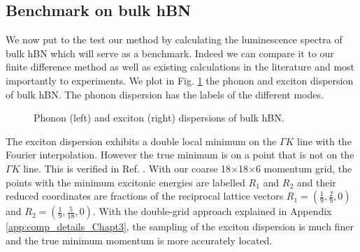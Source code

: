 \subsection{Benchmark on bulk hBN} \label{sec:bulk_hBN}
We now put to the test our method by calculating the luminescence spectra of bulk hBN which will serve as a benchmark. Indeed we can compare it to our finite difference method as well as existing calculations in the literature and most importantly to experiments. We plot in Fig. \ref{fig:ph_exc_disp_hBN} the phonon and exciton dispersion of bulk \acrlong{hBN}. The phonon dispersion has the labels of the different modes.
\begin{figure}[h!t]%
	\vspace{0.2cm}
	\setcapindent{2em}
	\centering
     \qquad
    \caption{Phonon (left) and exciton (right) dispersions of bulk \acrshort{hBN}.}
    \label{fig:ph_exc_disp_hBN} 
\end{figure}
The exciton dispersion exhibits a double local minimum on the $\Gamma K$ line with the Fourier interpolation. However the true minimum is on a point that is not on the $\Gamma K$ line. This is verified in Ref. \cite{zanfrognini2023distinguishing}.
With our coarse 18$\times$18$\times$6 momentum grid, the points with the minimum excitonic energies are labelled $R_1$ and $R_2$ and their reduced coordinates are fractions of the reciprocal lattice vectors $R_1=(\tfrac{1}{9},\tfrac{2}{9},0)$ and $R_2=(\tfrac{1}{9},\tfrac{5}{18},0)$. With the double-grid approach explained in Appendix \ref{app:comp_details_Chapt3}, the sampling of the exciton dispersion is much finer and the true minimum momentum is more accurately located.

